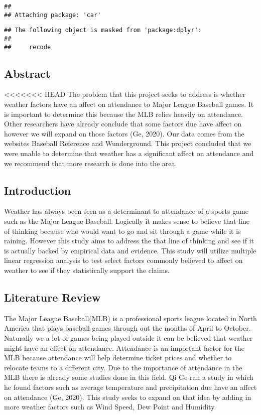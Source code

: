 \documentclass[
]{article}
\begin{document}
\begin{verbatim}
## 
## Attaching package: 'car'
\end{verbatim}

\begin{verbatim}
## The following object is masked from 'package:dplyr':
## 
##     recode
\end{verbatim}

\hypertarget{abstract}{%
\subsection{Abstract}\label{abstract}}

\textless\textless\textless\textless\textless\textless\textless{} HEAD
The problem that this project seeks to address is whether weather
factors have an affect on attendance to Major League Baseball games. It
is important to determine this because the MLB relies heavily on
attendance. Other researchers have already conclude that some factors
due have affect on however we will expand on those factors (Ge, 2020).
Our data comes from the websites Baseball Reference and Wunderground.
This project concluded that we were unable to determine that weather has
a significant affect on attendance and we recommend that more research
is done into the area.

\hypertarget{introduction}{%
\subsection{Introduction}\label{introduction}}

Weather has always been seen as a determinant to attendance of a sports
game such as the Major League Baseball. Logically it makes sense to
believe that line of thinking because who would want to go and sit
through a game while it is raining. However this study aims to address
the that line of thinking and see if it is actually backed by empirical
data and evidence. This study will utilize multiple linear regression
analysis to test select factors commonly believed to affect on weather
to see if they statistically support the claims.

\hypertarget{literature-review}{%
\subsection{Literature Review}\label{literature-review}}

The Major League Baseball(MLB) is a professional sports league located
in North America that plays baseball games through out the months of
April to October. Naturally we a lot of games being played outside it
can be believed that weather might have an effect on attendance.
Attendance is an important factor for the MLB because attendance will
help determine ticket prices and whether to relocate teams to a
different city. Due to the importance of attendance in the MLB there is
already some studies done in this field. Qi Ge ran a study in which he
found factors such as average temperature and precipitation due have an
affect on attendance (Ge, 2020). This study seeks to expand on that idea
by adding in more weather factors such as Wind Speed, Dew Point and
Humidity.
\end{document}

